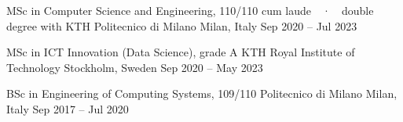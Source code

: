 

\begin{cventries}


  \cventryshort
    {MSc in Computer Science and Engineering, 110/110 cum laude~~·~~double degree with KTH}
    {Politecnico di Milano}
    {Milan, Italy}
    {Sep 2020 -- Jul 2023}


  \cventryshort
    {MSc in ICT Innovation (Data Science), grade A}
    {KTH Royal Institute of Technology}
    {Stockholm, Sweden}
    {Sep 2020 -- May 2023}


  \cventryshort
    {BSc in Engineering of Computing Systems, 109/110}
    {Politecnico di Milano}
    {Milan, Italy}
    {Sep 2017 -- Jul 2020}





\end{cventries}
